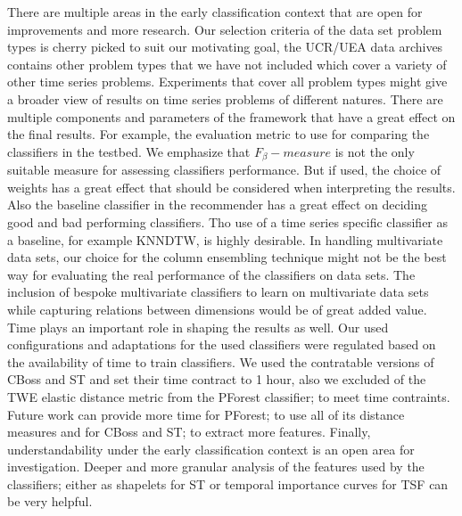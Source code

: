 There are multiple areas in the early classification context that are open for improvements and more research.
Our selection criteria of the data set problem types is cherry picked to suit our motivating goal, the UCR/UEA data archives contains other problem types that we have not included which cover a variety of other time series problems.
Experiments that cover all problem types might give a broader view of results on time series problems of different natures.
There are multiple components and parameters of the framework that have a great effect on the final results.
For example, the evaluation metric to use for comparing the classifiers in the testbed.
We emphasize that $F_{\beta}-measure$ is not the only suitable measure for assessing classifiers performance.
But if used, the choice of weights has a great effect that should be considered when interpreting the results.
Also the baseline classifier in the recommender has a great effect on deciding good and bad performing classifiers.
Tho use of a time series specific classifier as a baseline, for example KNNDTW, is highly desirable.
In handling multivariate data sets, our choice for the column ensembling technique might not be the best way for evaluating the real performance of the classifiers on data sets.
The inclusion of bespoke multivariate classifiers to learn on multivariate data sets while capturing relations between dimensions would be of great added value.
Time plays an important role in shaping the results as well.
Our used configurations and adaptations for the used classifiers were regulated based on the availability of time to train classifiers.
We used the contratable versions of CBoss and ST and set their time contract to 1 hour, also we excluded of the TWE elastic distance metric from the PForest classifier; to meet time contraints.
Future work can provide more time for PForest; to use all of its distance measures and for CBoss and ST; to extract more features.
Finally, understandability under the early classification context is an open area for investigation.
Deeper and more granular analysis of the features used by the classifiers; either as shapelets for ST or temporal importance curves for TSF can be very helpful.